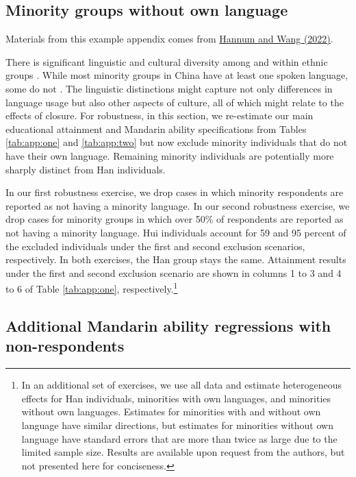 \subsection{Minority groups without own language\label{sec:app:esti:minoownlang}}

Materials from this example appendix comes from \href{https://linkinghub.elsevier.com/retrieve/pii/S0305750X21003491}{Hannum and Wang (2022)}. 

There is significant linguistic and cultural diversity among and within ethnic groups \autocite{harrell_linguistics_1993, dwyer_texture_1998}. While most minority groups in China have at least one spoken language, some do not \autocite{wang_chinas_2015}. The linguistic distinctions might capture not only differences in language usage but also other aspects of culture, all of which might relate to the effects of closure. For robustness, in this section, we re-estimate our main educational attainment and Mandarin ability specifications from Tables \ref{tab:app:one} and
\ref{tab:app:two} but now exclude minority individuals that do not have their own language. Remaining minority individuals are potentially more sharply distinct from Han individuals.

In our first robustness exercise, we drop cases in which minority respondents are reported as not having a minority language. In our second robustness exercise, we drop cases for minority groups in which over 50\% of respondents are reported as not having a minority language. Hui individuals account for 59 and 95 percent of the excluded individuals under the first and second exclusion scenarios, respectively. In both exercises, the Han group stays the same. Attainment results under the first and second exclusion scenario are shown in columns 1 to 3 and 4 to 6 of Table \ref{tab:app:one}, respectively.\footnote{In an additional set of exercises, we use all data and estimate heterogeneous effects for Han individuals, minorities with own languages, and minorities without own languages. Estimates for minorities with and without own language have similar directions, but estimates for minorities without own language have standard errors that are more than twice as large due to the limited sample size. Results are available upon request from the authors, but not presented here for conciseness.}

\blindtext

\subsection{Additional Mandarin ability regressions with non-respondents\label{sec:app:esti:mandwithna}}

